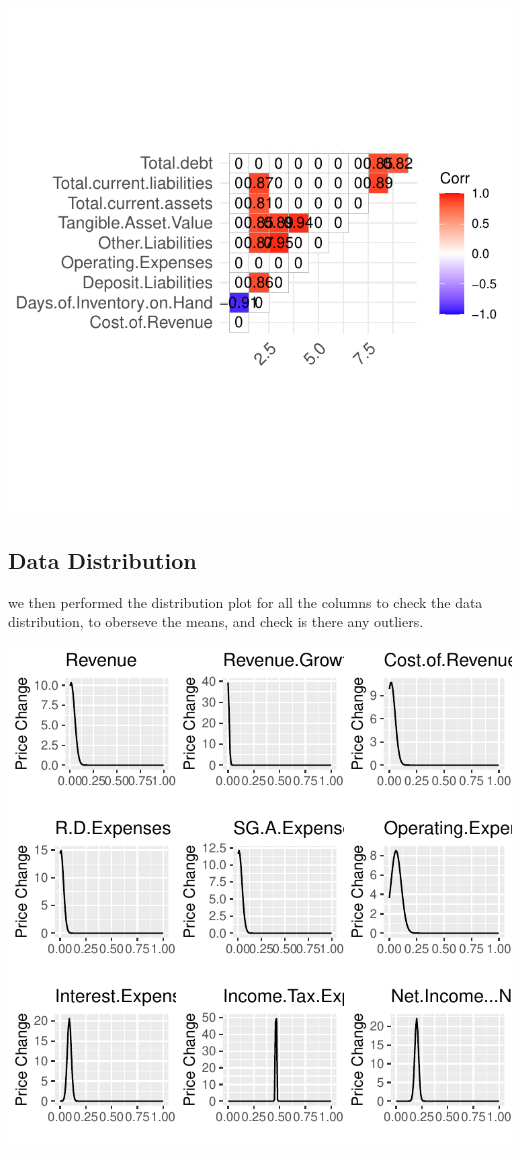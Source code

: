 \documentclass[11pt,]{article}
\begin{document}
\begin{center}\includegraphics{stock_analysis_files/figure-latex/corrplot-2} \end{center}

\hypertarget{data-distribution}{%
\subsection{Data Distribution}\label{data-distribution}}

we then performed the distribution plot for all the columns to check the
data distribution, to oberseve the means, and check is there any
outliers.

\begin{center}\includegraphics{stock_analysis_files/figure-latex/data normal distribution plot1-1} \end{center}
\end{document}
